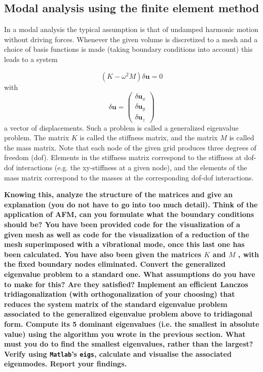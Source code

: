 \documentclass[12pt]{article}
\begin{document}
\subsection{Modal analysis using the finite element method}
In a modal analysis the typical assumption is that of undamped harmonic motion without driving
forces. Whenever the given volume is discretized to a mesh and a choice of basis functions is made
(taking boundary conditions into account) this leads to a system

$$(K - \omega^2 M)\delta \mathbf{u} = 0$$
with
$$\delta \mathbf{u}=\begin{pmatrix}
\delta \mathbf{u}_x\\
\delta \mathbf{u}_y\\
\delta \mathbf{u}_z
\end{pmatrix}$$
a vector of displacements. Such a problem is called a generalized eigenvalue problem. The matrix $K$
is called the stiffness matrix, and the matrix $M$ is called the mass matrix. Note that each node of the
given grid produces three degrees of freedom (dof). Elements in the stiffness matrix correspond to the
stiffness at dof-dof interactions (e.g. the xy-stiffness at a given node), and the elements of the mass
matrix correspond to the masses at the corresponding dof-dof interactions. 

\textbf{Knowing this, analyze the structure of the matrices and give an explanation (you do not have to go into too
much detail). Think of the application of AFM, can you formulate what the boundary
conditions should be? You have been provided code for the visualization of a given mesh as well as code for
the visualization of a reduction of the mesh superimposed with a vibrational mode, once
this last one has been calculated. You have also been given the matrices $K$ and $M$ , with
the fixed boundary nodes eliminated. Convert the generalized eigenvalue problem to a
standard one. What assumptions do you have to make for this? Are they satisfied? Implement an efficient Lanczos tridiagonalization (with orthogonalization of your choosing)
that reduces the system matrix of the standard eigenvalue problem associated to the
generalized eigenvalue problem above to tridiagonal form. Compute its 5  dominant eigenvalues (i.e. the smallest in
absolute value) using the algorithm you wrote in the previous section. What must you do to find the smallest eigenvalues, rather than the largest? Verify using \texttt{Matlab}’s \texttt{eigs}, calculate and visualise the associated eigenmodes. Report your findings.}
\end{document}
